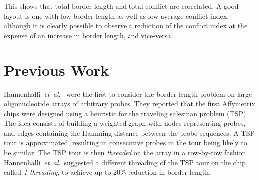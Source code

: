 \documentclass[runningheads]{llncs}
\newcommand{\ignore}[1]{}
\begin{document}
This shows that total border length and total conflict are correlated. A good
layout is one with low border length as well as low average conflict index,
although it is clearly possible to observe a reduction of the conflict index
at the expense of an increase in border length, and vice-versa.


\section{Previous Work}
\label{sec:previous_work}

\ignore{The first to formally address the border length problem were \cite{FELDMAN93}.
They showed how an optimal placement can be constructed based on a two-dimensional
Gray code. However, their work is restricted to \emph{uniform arrays} (arrays
containing all possible probes of a given length) and synchronous embeddings.}

Hannenhalli~{\it et~al}.\ \cite{HANNENHALLI02} were the first to consider the border
length problem on large
oligonucleotide arrays of arbitrary probes. They reported that the first Affymetrix
chips were designed using a heuristic for the traveling salesman problem (TSP). The
idea consists of building a weighted graph with nodes representing probes, and edges
containing the Hamming distance between the probe sequences. A TSP tour is approximated,
resulting in consecutive probes in the tour being likely to be similar. The TSP
tour is then \emph{threaded} on the array in a row-by-row fashion.
Hannenhalli~{\it et~al}.\ suggested a different threading of the TSP tour on the chip,
called \emph{1-threading}, to achieve up to 20\% reduction in border length.

\ignore{
Kahng~{\it et~al}.~\cite{KAHNG02} propose the \emph{Epitaxial} placement algorithm that
places a random probe in the center of the array and continues to
insert probes in spots adjacent to already filled spots, employing a
greedy heuristic to select the next spot to be filled and the probe
that is assigned to it. Priority is given to spots whose
neighbors are already filled, in which case the algorithm places the
probe with minimum sum of Hamming distances to its neighbors. If no
such a spot exists, the algorithm examines all non-filled spots~$s_i$
with $n_i \geq 1$ filled neighbors and finds a non-assigned probe
$p_j$ with minimum sum of Hamming distances to the neighboring probes
$H_{ij}$. For each possible assignment of $p_j$ to $s_i$, it computes
a cost $c(s_i,p_j) := k_{n_i} H_{ij} / n$, where $k_{n_i}$ are scaling
coefficients ($k_1 = 1$, $k_2 = 0.8$, and $k_3 = 0.6$), and makes the
assignment with minimum cost. With this algorithm, they claimed to
achieve up to 10\% reduction in border conflicts over the TSP-based
approach of Hannenhalli~{\it et~al}.\ \cite{HANNENHALLI02}.
}
\end{document}
